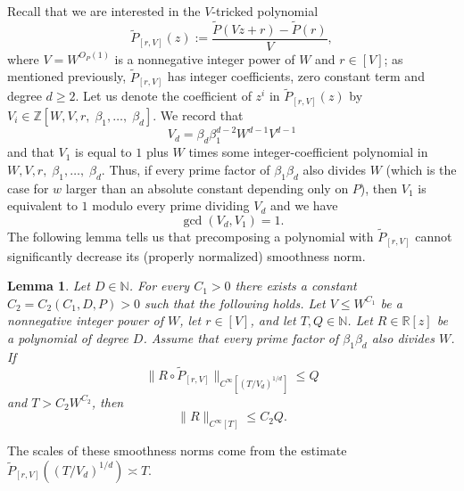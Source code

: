 \documentclass[11pt]{amsart}
\newtheorem{lemma}{Lemma}[section]
\theoremstyle{definition}
\newcommand{\N}{{\mathbb N}}
\begin{document}
Recall that we are interested in the $V$-tricked polynomial
$$\widetilde P_{[r, V]}(z):=\frac{\widetilde P(Vz+r)-\widetilde P(r)}{V},$$
where $V=W^{O_P(1)}$ is a nonnegative integer power of $W$ and $r\in[V]$; as mentioned previously, $\widetilde P_{[r, V]}$ has integer coefficients, zero constant term and degree $d\geq 2$.
Let us denote the coefficient of $z^i$ in $\widetilde P_{[r, V]}(z)$ by $V_i \in \mathbb{Z}[W,V,r,\; \beta_1, \ldots,\; \beta_d]$.  We record that
$$V_d=\beta_d \beta_1^{d-2} W^{d-1}V^{d-1}$$
and that $V_1$ is equal to $1$ plus $W$ times some integer-coefficient polynomial in $W,V,r,\; \beta_1, \ldots,\; \beta_d$.  Thus, if every prime factor of $\beta_1\beta_d$ also divides $W$ (which is the case for $w$ larger than an absolute constant depending only on $P$), then $V_1$ is equivalent to $1$ modulo every prime dividing $V_d$ and we have $$\gcd(V_d,V_1)=1.$$  The following lemma tells us that precomposing a polynomial with $\widetilde P_{[r, V]}$ cannot significantly decrease its (properly normalized) smoothness norm.




\begin{lemma}\label{lem:composing-polynomials-2}
Let $D\in\N$. For every $C_1>0$ there exists a constant $C_2 = C_2(C_1, D,P)>0$ such that the following holds.  Let $V \leq W^{C_1}$ be a {nonnegative} integer power of $W$, let $r \in [V]$, and let $T, Q \in\N$. Let $R \in \mathbb{R}[z]$ be a polynomial of degree $D$. Assume that every prime factor of $\beta_1\beta_d$ also divides $W$. If
$$\|R \circ \widetilde{P}_{[r, V]}\|_{C^\infty[(T/V_d)^{1/d}]} \leq Q$$
and $T>C_{2} W^{C_{2}}$,
then
$$\|R\|_{C^\infty[T]} \leq C_{2}Q.$$
\end{lemma}


The scales of these smoothness norms come from the estimate $\widetilde P_{[r,V]}((T/V_d)^{1/d}) \asymp T$. 
\end{document}
